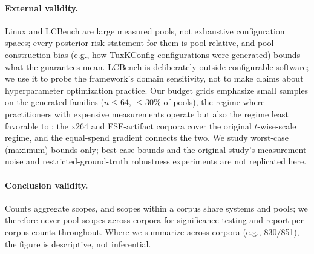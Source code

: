 \paragraph{External validity.} Linux and LCBench are large measured
pools, not exhaustive configuration spaces; every posterior-risk
statement for them is pool-relative, and pool-construction bias (e.g.,
how TuxKConfig configurations were generated) bounds what the guarantees
mean. LCBench is deliberately outside configurable software; we use it to
probe the framework's domain sensitivity, not to make claims about
hyperparameter optimization practice. Our budget grids emphasize small
samples on the generated families ($n \le 64$, $\le$30\% of pools), the
regime where practitioners with expensive measurements operate but also
the regime least favorable to \srs; the x264 and FSE-artifact corpora
cover the original $t$-wise-scale regime, and the equal-spend gradient
connects the two. We study worst-case (maximum) bounds only; best-case
bounds and the original study's measurement-noise and
restricted-ground-truth robustness experiments are not replicated here.

\paragraph{Conclusion validity.} Counts aggregate scopes, and scopes
within a corpus share systems and pools; we therefore never pool scopes
across corpora for significance testing and report per-corpus counts
throughout. Where we summarize across corpora (e.g., 830/851), the figure
is descriptive, not inferential.
